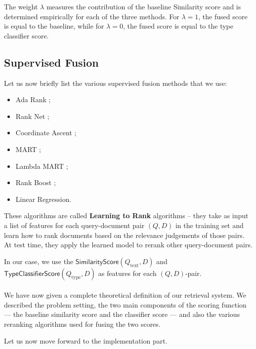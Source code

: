 The weight $\lambda$ measures the contribution of the baseline \textsf{Similarity} score and
is determined empirically for each of the three methods. For $\lambda=1$, the fused score is equal to the baseline,
while for $\lambda=0$, the fused score is equal to the type classifier score.

\subsection{Supervised Fusion}
Let us now briefly list the various supervised fusion methods that we use:
\begin{itemize}
 \item {Ada Rank} \cite{adaRank};
 \item {Rank Net} \cite{rankNet};
 \item {Coordinate Ascent} \cite{coordAscent};
 \item {MART} \cite{mart};
 \item {Lambda MART} \cite{lambda-mart};
 \item {Rank Boost} \cite{rankBoost};
  \item {Linear Regression}.
\end{itemize}

These algorithms are called \textbf{Learning to Rank} algorithms --
they take as input a list of features for each query-document pair $(Q,D)$ in the training set
and learn how to rank documents based on the
relevance judgements of those pairs. At test time, they apply the learned model to rerank other query-document pairs.

In our case, we use the $\textsf{SimilarityScore}(Q_{\text{text}},D)$ and $\textsf{TypeClassifierScore}(Q_{\text{type}}, D)$ 
as features for each $(Q,D)$-pair.
\\
\\
We have now given a complete theoretical definition of our retrieval system. We described the problem setting,
the two main components of the scoring function --- the baseline similarity score and the classifier score ---
and also the various reranking algorithms used for fusing the two scores.

Let us now move forward to the implementation part.


